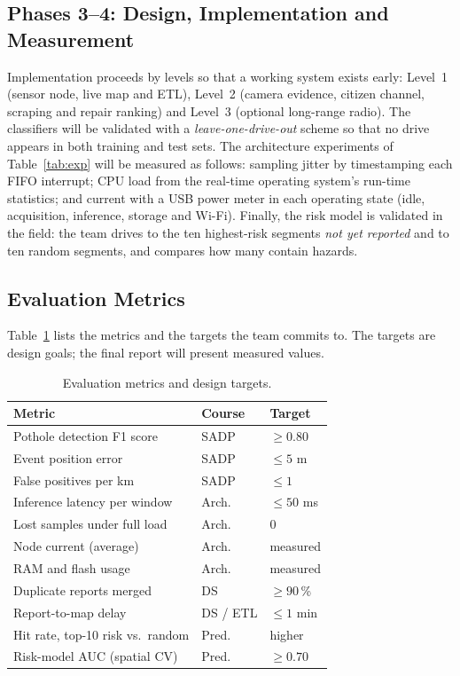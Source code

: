 \documentclass[journal,10pt]{IEEEtran}
\begin{document}
\subsection{Phases 3--4: Design, Implementation and Measurement}
Implementation proceeds by levels so that a working system exists early: Level~1 (sensor node, live map and ETL), Level~2 (camera evidence, citizen channel, scraping and repair ranking) and Level~3 (optional long-range radio). The classifiers will be validated with a \emph{leave-one-drive-out} scheme so that no drive appears in both training and test sets. The architecture experiments of Table~\ref{tab:exp} will be measured as follows: sampling jitter by timestamping each FIFO interrupt; CPU load from the real-time operating system's run-time statistics; and current with a USB power meter in each operating state (idle, acquisition, inference, storage and Wi-Fi). Finally, the risk model is validated in the field: the team drives to the ten highest-risk segments \emph{not yet reported} and to ten random segments, and compares how many contain hazards.

\subsection{Evaluation Metrics}
Table~\ref{tab:metrics} lists the metrics and the targets the team commits to. The targets are design goals; the final report will present measured values.

\begin{table}[!t]
\centering
\caption{Evaluation metrics and design targets.}
\label{tab:metrics}
\footnotesize
\begin{tabularx}{\columnwidth}{@{}>{\raggedright\arraybackslash}X l l@{}}
\toprule
\textbf{Metric} & \textbf{Course} & \textbf{Target} \\
\midrule
Pothole detection F1 score & SADP & $\geq 0.80$ \\
Event position error & SADP & $\leq 5$ m \\
False positives per km & SADP & $\leq 1$ \\
Inference latency per window & Arch. & $\leq 50$ ms \\
Lost samples under full load & Arch. & 0 \\
Node current (average) & Arch. & measured \\
RAM and flash usage & Arch. & measured \\
Duplicate reports merged & DS & $\geq 90$\,\% \\
Report-to-map delay & DS / ETL & $\leq 1$ min \\
Hit rate, top-10 risk vs.\ random & Pred. & higher \\
Risk-model AUC (spatial CV) & Pred. & $\geq 0.70$ \\
\bottomrule
\end{tabularx}
\end{table}
\end{document}
